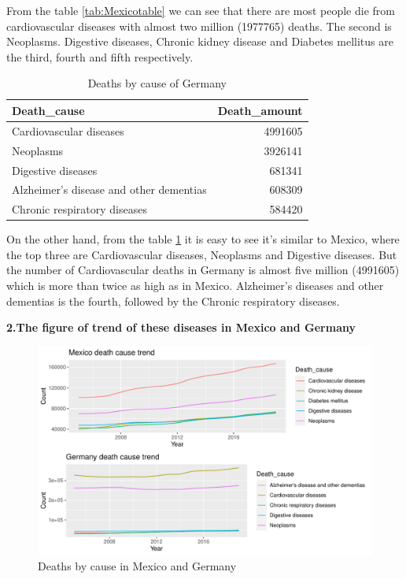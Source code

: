 \documentclass[11pt,a4paper,]{article}
\begin{document}
From the table \ref{tab:Mexicotable} we can see that there are most people die from cardiovascular diseases with almost two million (1977765) deaths. The second is Neoplasms. Digestive diseases, Chronic kidney disease and Diabetes mellitus are the third, fourth and fifth respectively.

\begin{table}

\caption{\label{tab:Germanytable}Deaths by cause of Germany}
\centering
\begin{tabular}[t]{l|r}
\hline
Death\_cause & Death\_amount\\
\hline
Cardiovascular diseases & 4991605\\
\hline
Neoplasms & 3926141\\
\hline
Digestive diseases & 681341\\
\hline
Alzheimer's disease and other dementias & 608309\\
\hline
Chronic respiratory diseases & 584420\\
\hline
\end{tabular}
\end{table}

On the other hand, from the table \ref{tab:Germanytable} it is easy to see it's similar to Mexico, where the top three are Cardiovascular diseases, Neoplasms and Digestive diseases. But the number of Cardiovascular deaths in Germany is almost five million (4991605) which is more than twice as high as in Mexico. Alzheimer's diseases and other dementias is the fourth, followed by the Chronic respiratory diseases.

\textbf{2.The figure of trend of these diseases in Mexico and Germany}

\begin{figure}
\centering
\includegraphics{Assignment4_files/figure-latex/MexicoAndGermanyfigure-1.pdf}
\caption{\label{fig:MexicoAndGermanyfigure}Deaths by cause in Mexico and Germany}
\end{figure}
\end{document}
